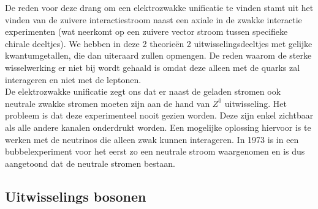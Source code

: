 \documentclass[../main.tex]{subfiles}
\begin{document}
De reden voor deze drang om een elektrozwakke unificatie te vinden stamt uit het vinden van de zuivere interactiestroom naast een axiale in de zwakke interactie experimenten (wat neerkomt op een zuivere vector stroom tussen specifieke chirale deeltjes). We hebben in deze 2 theorieën 2 uitwisselingsdeeltjes met gelijke kwantumgetallen, die dan uiteraard zullen opmengen. De reden waarom de sterke wisselwerking er niet bij wordt gehaald is omdat deze alleen met de quarks zal interageren en niet met de leptonen.\\
De elektrozwakke unificatie zegt ons dat er naast de geladen stromen ook neutrale zwakke stromen moeten zijn aan de hand van $Z^0$ uitwisseling. Het probleem is dat deze experimenteel nooit gezien worden. Deze zijn enkel zichtbaar als alle andere kanalen onderdrukt worden. Een mogelijke oplossing hiervoor is te werken met de neutrinos die alleen zwak kunnen interageren. In 1973 is in een bubbelexperiment voor het eerst zo een neutrale stroom waargenomen en is dus aangetoond dat de neutrale stromen bestaan.

\subsection{Uitwisselings bosonen}%
\label{sub:uitwisselings_bosonen}
\end{document}
